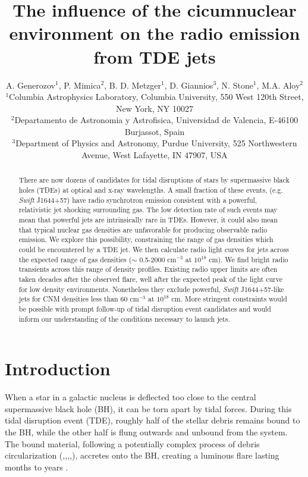 \documentclass[usenatbib,fleqn]{mnras}
\title{The influence of the cicumnuclear environment on the radio emission from TDE jets}
\author[Generozov et al.]{ A. Generozov$^{1}$, P. Mimica$^{2}$,
  B. D. Metzger$^{1}$,
  D. Giannios$^{3}$, 
  N. Stone$^{1}$,
  M.A. Aloy$^{2}$ 
  \\
  $^{1}$Columbia Astrophysics Laboratory, Columbia University, 550 West 120th Street, New York, NY 10027\\
  $^{2}$Departamento de Astronomia y Astrofisica, Universidad de Valencia, E-46100 Burjassot, Spain\\
  $^{3}$Department of Physics and Astronomy, Purdue University, 525
  Northwestern Avenue, West Lafayette, IN 47907, USA}
\begin{document}
\maketitle
\begin{abstract}
  There are now dozens of candidates for tidal disruptions of stars by
  supermassive black holes (TDEs) at optical and x-ray wavelengths. A
  small fraction of these events, (e.g. {\it Swift} J1644+57) have radio
  synchrotron emission consistent with a powerful, relativistic jet
  shocking surrounding gas. The low detection rate of such events may
  mean that powerful jets are intrinsically rare in TDEs. However, it
  could also mean that typical nuclear gas densities are unfavorable
  for producing observable radio emission. We explore this
  possibility, constraining the range of gas densities which could be
  encountered by a TDE jet. We then calculate radio light curves for
  jets across the expected range of gas densities ($\sim$ 0.5-2000
  cm$^{-3}$ at $10^{18}$ cm). We find bright radio transients across
  this range of density profiles. Existing radio upper limits are
  often taken decades after the observed flare, well after the
  expected peak of the light curve for low density
  environments. Nonetheless they exclude powerful, {\it Swift} J1644+57-like
  jets for CNM densities less than 60 cm$^{-3}$ at $10^{18}$ cm. More
  stringent constraints would be possible with prompt follow-up of
  tidal disruption event candidates and would inform our understanding
  of the conditions necessary to launch jets.
\end{abstract}
\section{Introduction}
\label{sec:intro}
When a star in a galactic nucleus is deflected too close to the
central supermassive black hole (BH), it can be torn apart by tidal
forces.  During this tidal disruption event (TDE), roughly half of the
stellar debris remains bound to the BH, while the other half is flung
outwards and unbound from the system.  The bound material, following a
potentially complex process of debris circularization
(\citealt{Guillochon+2013},\citealt{Hayasaki+2013},\citealt{Hayasaki+2015},\citealt{Shiokawa+2015},\citealt{Bonnerot+2015}),
accretes onto the BH, creating a luminous flare lasting months to
years \citep{Hills1975, Carter+1982, Rees1988}.
\end{document}
